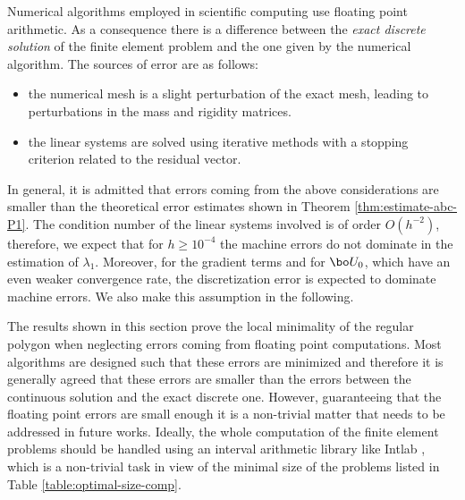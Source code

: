 \begin{rem}
Numerical algorithms employed in scientific computing use floating point arithmetic. As a consequence there is a difference between the \emph{exact discrete solution} of the finite element problem and the one given by the numerical algorithm. The sources of error are as follows:
\begin{itemize}
\item the numerical mesh is a slight perturbation of the exact mesh, leading to perturbations in the mass and rigidity matrices.
\item the linear systems are solved using iterative methods with a stopping criterion related to the residual vector.
\end{itemize}
In general, it is admitted that errors coming from the above considerations are smaller than the theoretical error estimates shown in Theorem \ref{thm:estimate-abc-P1}. The condition number of the linear systems involved is of order $O(h^{-2})$, therefore, we expect that for $h\geq 10^{-4}$ the machine errors do not dominate in the estimation of $\lambda_1$. Moreover, for the gradient terms and for $\bo U_0$, which have an even weaker convergence rate, the discretization error is expected to dominate machine errors. We also make this assumption in the following.

The results shown in this section prove the local minimality of the regular polygon when neglecting errors coming from floating point computations. Most algorithms are designed such that these errors are minimized and therefore it is generally agreed that these errors are smaller than the errors between the continuous solution and the exact discrete one. However, guaranteeing that the floating point errors are small enough it is a non-trivial matter that needs to be addressed in future works. Ideally, the whole computation of the finite element problems should be handled using an interval arithmetic library like Intlab \cite{intlab}, which is a non-trivial task in view of the minimal size of the problems listed in Table \ref{table:optimal-size-comp}.
\end{rem}

